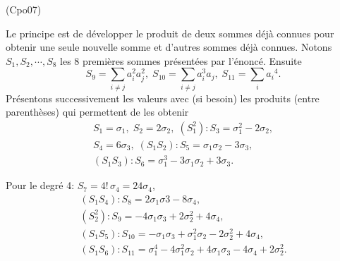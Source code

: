 \begin{tiny}(Cpo07)\end{tiny} Le principe est de développer le produit de deux sommes déjà connues pour obtenir une seule nouvelle somme et d'autres sommes déjà connues.\newline
Notons $S_1, S_2,\cdots, S_8$ les 8 premières sommes présentées par l'énoncé. Ensuite
\[
  S_9 = \sum_{i\neq j}a_i^2 a_j^2,\;
  S_{10} = \sum_{i\neq j}a_i^3 a_j,\;
  S_{11} = \sum_{i}{a_i}^4.
\]
Présentons successivement les valeurs avec (si besoin) les produits (entre parenthèses) qui permettent de les obtenir
\begin{multline*}
  S_1 = \sigma_1, \; S_2 = 2 \sigma_2,\; 
  (S_1^2): S_3 = \sigma_1^2 - 2 \sigma_2, \\
  S_4 = 6\sigma_3,\; (S_1S_2): S_5 = \sigma_1 \sigma_2 - 3\sigma_3,\;\\
  (S_1S_3): S_6 = \sigma_1^3 - 3\sigma_1 \sigma_2 + 3\sigma_3.
\end{multline*}

Pour le degré 4: $S_7 = 4!\, \sigma_4 = 24 \sigma_4$,
\begin{multline*}
  (S_1 S_4) : S_8 = 2\sigma_1 \sigma3 - 8 \sigma_4,\\
  (S_2^2): S_9 = -4\sigma_1\sigma_3 + 2\sigma_2^2 + 4 \sigma_4,\\
  (S_1 S_5): S_{10} = -\sigma_1\sigma_3 + \sigma_1^2 \sigma_2 - 2\sigma_2^2 + 4\sigma_4,\\
  (S_1 S_6): S_{11} = \sigma_1^4 - 4 \sigma_1^2 \sigma_2 + 4 \sigma_1 \sigma_3 - 4 \sigma_4 + 2\sigma_2^2.
\end{multline*}

